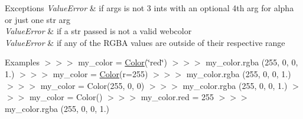 \begin{DoxyExceptions}{Exceptions}
{\em Value\+Error} & if args is not 3 ints with an optional 4th arg for alpha or just one str arg \\
\hline
{\em Value\+Error} & if a str passed is not a valid webcolor \\
\hline
{\em Value\+Error} & if any of the R\+G\+BA values are outside of their respective range \\
\hline
\end{DoxyExceptions}
\begin{DoxyParagraph}{Examples}
$>$$>$$>$ my\+\_\+color = \mbox{\hyperlink{classbridges_1_1color_1_1_color}{Color}}(\char`\"{}red\char`\"{}) $>$$>$$>$ my\+\_\+color.\+rgba (255, 0, 0, 1.) $>$$>$$>$ my\+\_\+color = \mbox{\hyperlink{classbridges_1_1color_1_1_color}{Color}}(r=255) $>$$>$$>$ my\+\_\+color.\+rgba (255, 0, 0, 1.) $>$$>$$>$ my\+\_\+color = Color(255, 0, 0) $>$$>$$>$ my\+\_\+color.\+rgba (255, 0, 0, 1.) $>$$>$$>$ my\+\_\+color = Color() $>$$>$$>$ my\+\_\+color.\+red = 255 $>$$>$$>$ my\+\_\+color.\+rgba (255, 0, 0, 1.) 
\end{DoxyParagraph}
